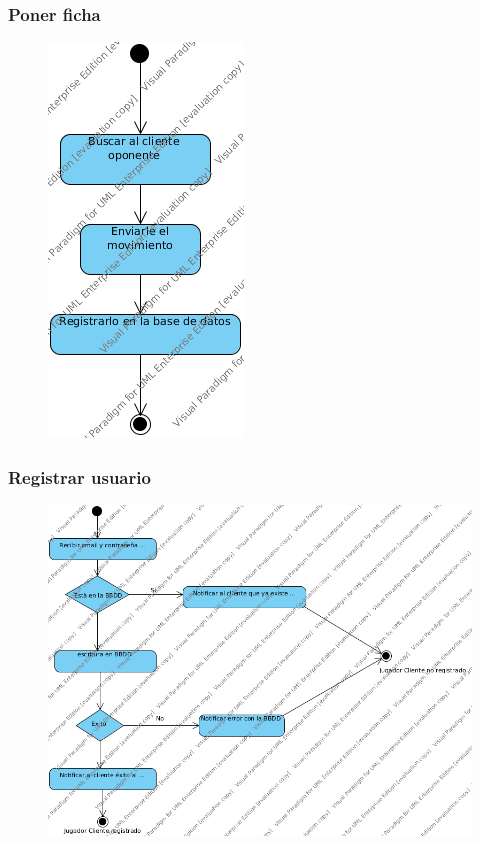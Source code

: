 \subsubsection{Poner ficha}
 \begin{figure}[h]
 \centering
 \includegraphics[scale=0.5]{img/ms_PonerFichaServidor.png}
 \end{figure}
 \clearpage
\subsubsection{Registrar usuario}
 \begin{figure}[h]
 \centering
 \includegraphics[scale=0.5]{img/ms_RegistrarUsuarioServidor.png}
 \end{figure}
